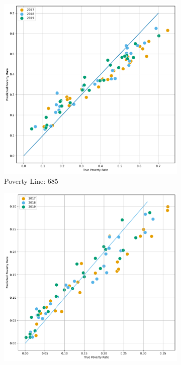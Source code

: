 \begin{figure}[H]
\caption{Correlation: Predicted Poverty against true by Region (WB Version)}
\centering
        \centering
        \begin{subfigure}[b]{0.47\textwidth}
            \centering
            \includegraphics[width=\textwidth]{../figures/baseline_report/fig4_2_prediction_vs_true_poverty_rate_regions_p685_scatter.pdf}
            \caption{Poverty Line: 685}
        \end{subfigure}
        \hfill
        \begin{subfigure}[b]{0.47\textwidth}
            \centering
            \includegraphics[width=\textwidth]{../figures/baseline_report/fig4_2_prediction_vs_true_poverty_rate_regions_p365_scatter.pdf}

\end{subfigure}
\end{figure}
